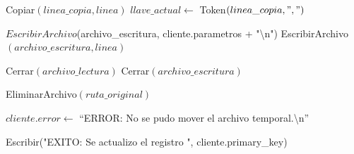 \begin{tcolorbox}[colback=white, colframe=azul_unam, 
title=Pseudocódigo: update.c, breakable]
\begin{algorithmic}[1]

    \State Copiar$(linea\_copia, linea)$
    \State $llave\_actual \gets$ Token$(linea\_copia, ",")$

        \State $EscribirArchivo$(archivo\_escritura, cliente.parametros + "\textbackslash n")
    \Else
        \State EscribirArchivo$(archivo\_escritura, linea)$
    \EndIf

\EndWhile

\State Cerrar$(archivo\_lectura)$
\State Cerrar$(archivo\_escritura)$

\State EliminarArchivo$(ruta\_original)$

    \State $cliente.error \gets$ ``ERROR: No se pudo mover el archivo temporal.\textbackslash n''
    \State \Return
\EndIf

\State Escribir("EXITO: Se actualizo el registro ", cliente.primary\_key)

\EndProcedure

\end{algorithmic}
\end{tcolorbox}